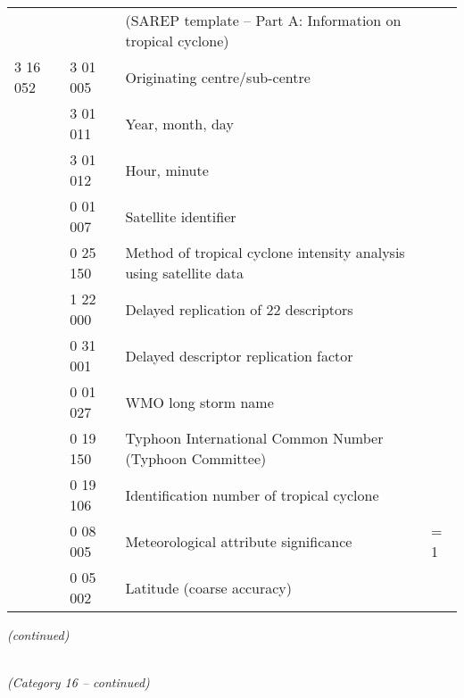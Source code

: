 \begin{longtable}[]{@{}llll@{}}
& & (SAREP template -- Part A: Information on tropical cyclone) &\tabularnewline
3 16 052 & 3 01 005 & Originating centre/sub-centre &\tabularnewline
& 3 01 011 & Year, month, day &\tabularnewline
& 3 01 012 & Hour, minute &\tabularnewline
& 0 01 007 & Satellite identifier &\tabularnewline
& 0 25 150 & Method of tropical cyclone intensity analysis using satellite data &\tabularnewline
& 1 22 000 & Delayed replication of 22 descriptors &\tabularnewline
& 0 31 001 & Delayed descriptor replication factor &\tabularnewline
& 0 01 027 & WMO long storm name &\tabularnewline
& 0 19 150 & Typhoon International Common Number (Typhoon Committee) &\tabularnewline
& 0 19 106 & Identification number of tropical cyclone &\tabularnewline
& 0 08 005 & Meteorological attribute significance & = 1\tabularnewline
& 0 05 002 & Latitude (coarse accuracy) &\tabularnewline
\bottomrule
\end{longtable}

\emph{(continued)}

\emph{\\
(Category 16 -- continued)}

